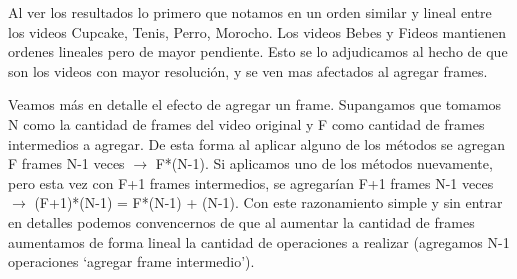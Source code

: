 \begin{figure}[ht]
	\begin{center}
	\end{center}
\end{figure}
\FloatBarrier

\par Al ver los resultados lo primero que notamos en un orden similar y lineal entre los videos Cupcake, Tenis, Perro, Morocho. Los videos Bebes y Fideos mantienen ordenes lineales pero de mayor pendiente. Esto se lo adjudicamos al hecho de que son los videos con mayor resoluci\'on, y se ven mas afectados al agregar frames.

\par Veamos m\'as en detalle el efecto de agregar un frame. Supangamos que tomamos N como la cantidad de frames del video original y F como cantidad de frames intermedios a agregar. De esta forma al aplicar alguno de los m\'etodos se agregan F frames N-1 veces $\longrightarrow$ F*(N-1). Si aplicamos uno de los m\'etodos nuevamente, pero esta vez con F+1 frames intermedios, se agregar\'ian F+1 frames N-1 veces $\longrightarrow$ (F+1)*(N-1) = F*(N-1) + (N-1). Con este razonamiento simple y sin entrar en detalles podemos convencernos de que al aumentar la cantidad de frames aumentamos de forma lineal la cantidad de operaciones a realizar (agregamos N-1 operaciones `agregar frame intermedio').
